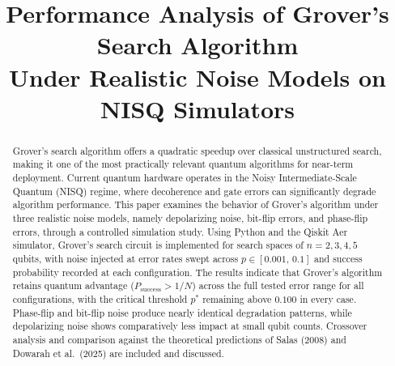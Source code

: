 \documentclass[conference]{IEEEtran}
\begin{document}
\title{Performance Analysis of Grover's Search Algorithm\\
Under Realistic Noise Models on NISQ Simulators}

\author{
  \and
  \and
}

\maketitle

\begin{abstract}
Grover's search algorithm offers a quadratic speedup over classical unstructured
search, making it one of the most practically relevant quantum algorithms for
near-term deployment. Current quantum hardware operates in the Noisy
Intermediate-Scale Quantum (NISQ) regime, where decoherence and gate errors
can significantly degrade algorithm performance. This paper examines the behavior
of Grover's algorithm under three realistic noise models, namely depolarizing
noise, bit-flip errors, and phase-flip errors, through a controlled simulation
study. Using Python and the Qiskit Aer simulator, Grover's search circuit is
implemented for search spaces of $n = 2, 3, 4, 5$ qubits, with noise injected
at error rates swept across $p \in [0.001,\, 0.1]$ and success probability
recorded at each configuration. The results indicate that Grover's algorithm
retains quantum advantage ($P_{\text{success}} > 1/N$) across the full tested
error range for all configurations, with the critical threshold $p^{*}$ remaining
above $0.100$ in every case. Phase-flip and bit-flip noise produce nearly
identical degradation patterns, while depolarizing noise shows comparatively
less impact at small qubit counts. Crossover analysis and comparison against
the theoretical predictions of Salas (2008) and Dowarah et al.\ (2025) are
included and discussed.
\end{abstract}
\end{document}
